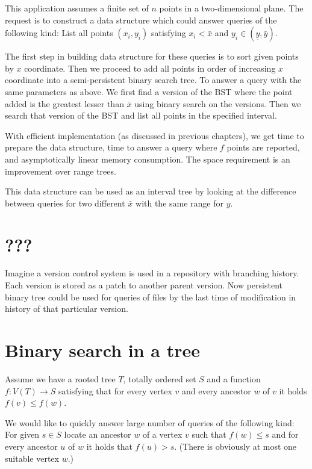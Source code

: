 This application assumes a finite set of $n$ points in a two-dimensional plane. The request is to construct a data structure which could answer queries of the following kind: List %
all points $(x_i,y_i)$ satisfying $x_i < \bar x$ and $ y_i \in (\underset{\bar{}}{y}, \bar y) $.

The first step in building data structure for these queries is to sort given points by $x$ coordinate. Then we proceed to add all points in order of increasing $x$ coordinate into a semi-persistent binary search tree. To answer a query with the same parameters as above. We first find a version of the BST where the point added is the greatest lesser than $\bar x$ using binary search on the versions. Then we search that version of the BST and list all points in the specified interval.

With efficient implementation (as discussed in previous chapters), we get  time to prepare the data structure,  time to answer a query where $f$ points are reported, and asymptotically linear memory consumption. The space requirement is an improvement over range trees\cite{range-trees}.

This data structure can be used as an interval tree by looking at the difference between queries for two different $\bar x$ with the same range for $y$. %


\section{???}

Imagine a version control system is used in a repository with branching history. Each version is stored as a patch to another parent version. Now persistent binary tree could be used for queries of files by the last time of modification in history of that particular version.

\section{Binary search in a tree}

Assume we have a rooted tree $T$, totally ordered set $S$ and a function $f: V(T) \rightarrow S$ satisfying that for every vertex $v$ and every ancestor $w$ of $v$ it holds $f(v) \leq f(w)$. 


We would like to quickly answer large number of queries of the following kind: For given $s \in S$ locate an ancestor $w$ of a vertex $v$ such that $f(w) \leq s$ and for every ancestor $u$ of $w$ it holds that $f(u) > s$. (There is obviously at most one suitable vertex $w$.)

